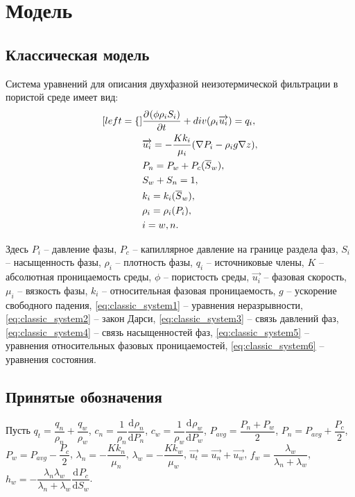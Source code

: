 \newcommand*{\pd}[3][]{\ensuremath{\dfrac{\partial^{#1} #2}{\partial #3^{#1}}}}
\newcommand*{\dd}[3][]{\ensuremath{\dfrac{\mathrm d^{#1} #2}{\mathrm d #3^{#1}}}}

\section{Модель}
\subsection{Классическая модель}
\label{classic_model}
Система уравнений для описания двухфазной неизотермической фильтрации в пористой среде
имеет вид:
\begin{subequations} \label{eq:classic_system}
  \begin{align}[left = \empheqlbrace\,]
    &\pd {(\phi \rho_i S_i)}{t} + div(\rho_i \overrightarrow{u_i}) = q_i, \label{eq:classic_system1} \\
    &\overrightarrow{u_i} = -\frac{K k_i}{\mu_i}(\nabla P_i - {\rho}_i g \nabla z), \label{eq:classic_system2} \\
    &P_n = P_w + P_{c}(\overline{S}_w), \label{eq:classic_system3} \\
    &S_w + S_n = 1, \label{eq:classic_system4} \\
    &k_i = k_i(\overline{S}_w), \label{eq:classic_system5} \\
    &\rho_i = \rho_i(P_i), \label{eq:classic_system6} \\
    &i = w,n \nonumber .
  \end{align}
\end{subequations}

Здесь 
$P_i$ -- давление фазы,
$P_c$ -- капиллярное давление на границе раздела фаз,
$S_i$ -- насыщенность фазы,
${\rho}_i$ -- плотность фазы,
$q_i$ -- источниковые члены,
$K$ -- абсолютная проницаемость среды,
$\phi$ -- пористость среды,
$\overrightarrow{u_i}$ -- фазовая скорость,
$\mu_i$ -- вязкость фазы,
$k_i$ -- относительная фазовая проницаемость,
$g$ -- ускорение свободного падения,
\eqref{eq:classic_system1} -- уравнения неразрывности,
\eqref{eq:classic_system2} -- закон Дарси,
\eqref{eq:classic_system3} -- связь давлений фаз,
\eqref{eq:classic_system4} -- связь насыщенностей фаз,
\eqref{eq:classic_system5} -- уравнения относительных фазовых проницаемостей,
\eqref{eq:classic_system6} -- уравнения состояния.

\subsection{Принятые обозначения}
\label{syms}
Пусть $q_t = \dfrac{q_n}{\rho_n} + \dfrac{q_w}{\rho_w}$,
$c_n = \dfrac{1}{\rho_n} \dd{\rho_n}{P_n}$,
$c_w = \dfrac{1}{\rho_w} \dd{\rho_w}{P_w}$,
$P_{avg} = \dfrac{P_n + P_w}{2}$,
$P_n = P_{avg} + \dfrac{P_c}{2}$,
$P_w = P_{avg} - \dfrac{P_c}{2}$,
$\lambda_n = -\dfrac{K k_n}{\mu_n}$,
$\lambda_w = -\dfrac{K k_w}{\mu_w}$,
$\overrightarrow{u_t} = \overrightarrow{u_n} + \overrightarrow{u_w}$,
$f_w = \dfrac{\lambda_w}{\lambda_n + \lambda_w}$,
$h_w = - \dfrac{\lambda_n\lambda_w}{\lambda_n + \lambda_w} \dd{P_c}{S_w}$.


